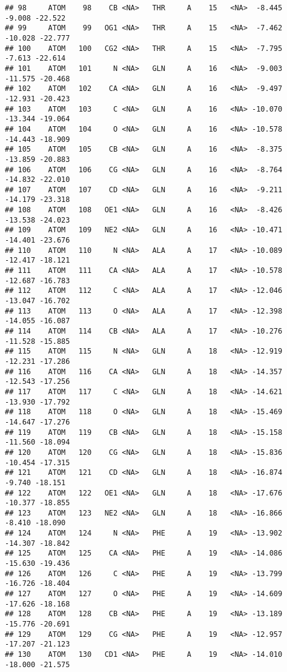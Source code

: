 \documentclass[
]{article}
\begin{document}
\begin{verbatim}
## 98     ATOM    98    CB <NA>   THR     A    15   <NA>  -8.445  -9.008 -22.522
## 99     ATOM    99   OG1 <NA>   THR     A    15   <NA>  -7.462 -10.028 -22.777
## 100    ATOM   100   CG2 <NA>   THR     A    15   <NA>  -7.795  -7.613 -22.614
## 101    ATOM   101     N <NA>   GLN     A    16   <NA>  -9.003 -11.575 -20.468
## 102    ATOM   102    CA <NA>   GLN     A    16   <NA>  -9.497 -12.931 -20.423
## 103    ATOM   103     C <NA>   GLN     A    16   <NA> -10.070 -13.344 -19.064
## 104    ATOM   104     O <NA>   GLN     A    16   <NA> -10.578 -14.443 -18.909
## 105    ATOM   105    CB <NA>   GLN     A    16   <NA>  -8.375 -13.859 -20.883
## 106    ATOM   106    CG <NA>   GLN     A    16   <NA>  -8.764 -14.832 -22.010
## 107    ATOM   107    CD <NA>   GLN     A    16   <NA>  -9.211 -14.179 -23.318
## 108    ATOM   108   OE1 <NA>   GLN     A    16   <NA>  -8.426 -13.538 -24.023
## 109    ATOM   109   NE2 <NA>   GLN     A    16   <NA> -10.471 -14.401 -23.676
## 110    ATOM   110     N <NA>   ALA     A    17   <NA> -10.089 -12.417 -18.121
## 111    ATOM   111    CA <NA>   ALA     A    17   <NA> -10.578 -12.687 -16.783
## 112    ATOM   112     C <NA>   ALA     A    17   <NA> -12.046 -13.047 -16.702
## 113    ATOM   113     O <NA>   ALA     A    17   <NA> -12.398 -14.055 -16.087
## 114    ATOM   114    CB <NA>   ALA     A    17   <NA> -10.276 -11.528 -15.885
## 115    ATOM   115     N <NA>   GLN     A    18   <NA> -12.919 -12.231 -17.286
## 116    ATOM   116    CA <NA>   GLN     A    18   <NA> -14.357 -12.543 -17.256
## 117    ATOM   117     C <NA>   GLN     A    18   <NA> -14.621 -13.930 -17.792
## 118    ATOM   118     O <NA>   GLN     A    18   <NA> -15.469 -14.647 -17.276
## 119    ATOM   119    CB <NA>   GLN     A    18   <NA> -15.158 -11.560 -18.094
## 120    ATOM   120    CG <NA>   GLN     A    18   <NA> -15.836 -10.454 -17.315
## 121    ATOM   121    CD <NA>   GLN     A    18   <NA> -16.874  -9.740 -18.151
## 122    ATOM   122   OE1 <NA>   GLN     A    18   <NA> -17.676 -10.377 -18.855
## 123    ATOM   123   NE2 <NA>   GLN     A    18   <NA> -16.866  -8.410 -18.090
## 124    ATOM   124     N <NA>   PHE     A    19   <NA> -13.902 -14.307 -18.842
## 125    ATOM   125    CA <NA>   PHE     A    19   <NA> -14.086 -15.630 -19.436
## 126    ATOM   126     C <NA>   PHE     A    19   <NA> -13.799 -16.726 -18.404
## 127    ATOM   127     O <NA>   PHE     A    19   <NA> -14.609 -17.626 -18.168
## 128    ATOM   128    CB <NA>   PHE     A    19   <NA> -13.189 -15.776 -20.691
## 129    ATOM   129    CG <NA>   PHE     A    19   <NA> -12.957 -17.207 -21.123
## 130    ATOM   130   CD1 <NA>   PHE     A    19   <NA> -14.010 -18.000 -21.575

\end{verbatim}
\end{document}
